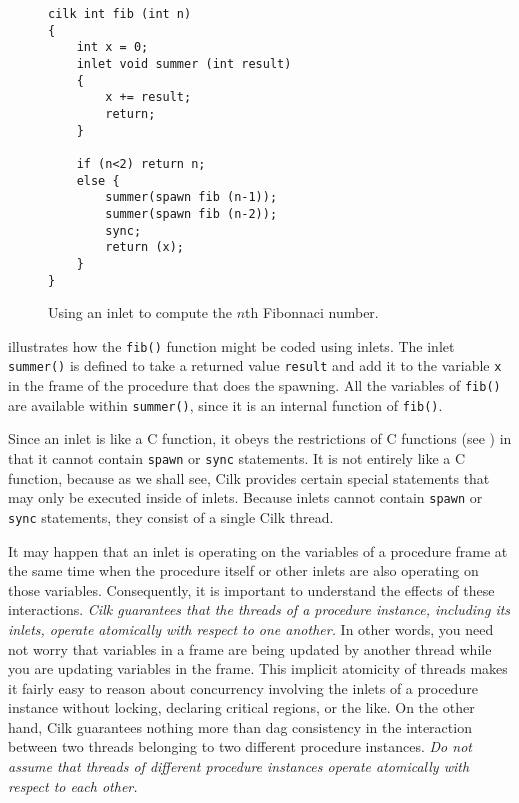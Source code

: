 \begin{figure}[t]
\begin{center}
\begin{minipage}{.6\linewidth}
\small
\begin{verbatim}
cilk int fib (int n)
{
    int x = 0;
    inlet void summer (int result)
    {
        x += result;
        return;
    }

    if (n<2) return n;
    else {
        summer(spawn fib (n-1));
        summer(spawn fib (n-2));
        sync;
        return (x);
    }
}
\end{verbatim}
\end{minipage}
\end{center}
\caption{\small Using an inlet to compute the $n$th Fibonnaci number.}
\label{fig:inlet-fib}
\end{figure}

 illustrates how the \texttt{fib()} function might
be coded using inlets.  The inlet \texttt{summer()} is defined to take
a returned value \texttt{result} and add it to the variable \texttt{x}
in the frame of the procedure that does the spawning.  All the
variables of \texttt{fib()} are available within \texttt{summer()},
since it is an internal function of \texttt{fib()}.

Since an inlet is like a C function, it obeys the restrictions of C
functions (see ) in that it cannot contain
\texttt{spawn} or \texttt{sync} statements.  It is not entirely like a
C function, because as we shall see, Cilk provides certain special
statements that may only be executed inside of inlets.  Because inlets
cannot contain \texttt{spawn} or \texttt{sync} statements, they
consist of a single Cilk thread.

  It may happen that an inlet is
operating on the variables of a procedure frame at the same time when
the procedure itself or other inlets are also operating on those
variables.  Consequently, it is important to understand the effects of
these interactions.  \emph{Cilk guarantees that the threads of a
  procedure instance, including its inlets, operate atomically with
  respect to one another.}  In other words, you need not worry that
variables in a frame are being updated by another thread while you are
updating variables in the frame.  This implicit atomicity of threads
makes it fairly easy to reason about concurrency involving the inlets
of a procedure instance without locking, declaring critical regions,
or the like.  On the other hand, Cilk guarantees nothing more than dag
consistency  in the interaction between two
threads belonging to two different procedure instances.  \emph{Do not
  assume that threads of different procedure instances operate
  atomically with respect to each other.}  

